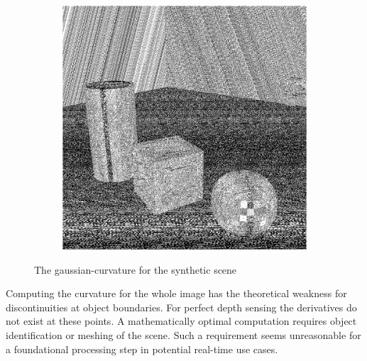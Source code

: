 \begin{figure}[H]
\begin{subfigure}[t]{0.32\textwidth}
    \end{subfigure}
    \begin{subfigure}[t]{0.32\textwidth}
        \includegraphics[width=\linewidth]{chapter04/img/gauss-0210.png}
    \end{subfigure}
    \caption[\Gls{gaussian-curvature} in the synthetic scene]{The \Gls{gaussian-curvature} for the synthetic scene}\label{fig:gaussian-curvature}
\end{figure}
Computing the curvature for the whole image has the theoretical weakness for discontinuities at object boundaries.
For perfect depth sensing the derivatives do not exist at these points.
A mathematically optimal computation requires object identification or meshing of the scene.
Such a requirement seems unreasonable for a foundational processing step in potential real-time use cases.
